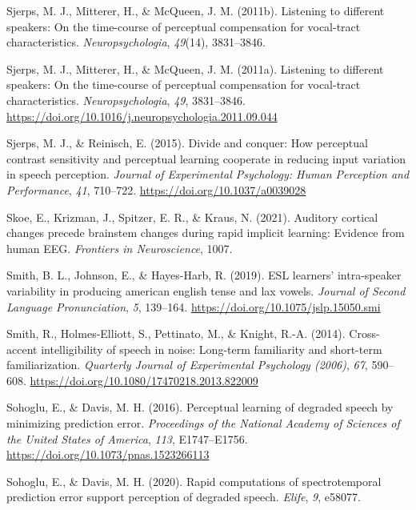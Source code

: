 \documentclass[
  11pt,
  english,
  man,floatsintext]{apa6}
\newlength{\cslhangindent}
\newlength{\cslentryspacingunit} %
\newenvironment{CSLReferences}[2] %
 {%
  \setlength{\parindent}{0pt}
  \ifodd #1
  \let\oldpar\par
  \def\par{\hangindent=\cslhangindent\oldpar}
  \fi
  \setlength{\parskip}{#2\cslentryspacingunit}
 }%
 {}
\begin{document}
\begin{CSLReferences}{1}{0}
\leavevmode{}%
Sjerps, M. J., Mitterer, H., \& McQueen, J. M. (2011b). Listening to different speakers: On the time-course of perceptual compensation for vocal-tract characteristics. \emph{Neuropsychologia}, \emph{49}(14), 3831--3846.

\leavevmode{}%
Sjerps, M. J., Mitterer, H., \& McQueen, J. M. (2011a). Listening to different speakers: On the time-course of perceptual compensation for vocal-tract characteristics. \emph{Neuropsychologia}, \emph{49}, 3831--3846. \url{https://doi.org/10.1016/j.neuropsychologia.2011.09.044}

\leavevmode{}%
Sjerps, M. J., \& Reinisch, E. (2015). Divide and conquer: How perceptual contrast sensitivity and perceptual learning cooperate in reducing input variation in speech perception. \emph{Journal of Experimental Psychology: Human Perception and Performance}, \emph{41}, 710--722. \url{https://doi.org/10.1037/a0039028}

\leavevmode{}%
Skoe, E., Krizman, J., Spitzer, E. R., \& Kraus, N. (2021). Auditory cortical changes precede brainstem changes during rapid implicit learning: Evidence from human EEG. \emph{Frontiers in Neuroscience}, 1007.

\leavevmode{}%
Smith, B. L., Johnson, E., \& Hayes-Harb, R. (2019). ESL learners' intra-speaker variability in producing american english tense and lax vowels. \emph{Journal of Second Language Pronunciation}, \emph{5}, 139--164. \url{https://doi.org/10.1075/jslp.15050.smi}

\leavevmode{}%
Smith, R., Holmes-Elliott, S., Pettinato, M., \& Knight, R.-A. (2014). Cross-accent intelligibility of speech in noise: Long-term familiarity and short-term familiarization. \emph{Quarterly Journal of Experimental Psychology (2006)}, \emph{67}, 590--608. \url{https://doi.org/10.1080/17470218.2013.822009}

\leavevmode{}%
Sohoglu, E., \& Davis, M. H. (2016). Perceptual learning of degraded speech by minimizing prediction error. \emph{Proceedings of the National Academy of Sciences of the United States of America}, \emph{113}, E1747--E1756. \url{https://doi.org/10.1073/pnas.1523266113}

\leavevmode{}%
Sohoglu, E., \& Davis, M. H. (2020). Rapid computations of spectrotemporal prediction error support perception of degraded speech. \emph{Elife}, \emph{9}, e58077.


\end{CSLReferences}
\end{document}
